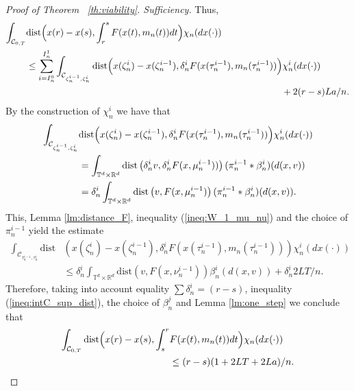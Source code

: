 \documentclass[12pt]{article}
\newcommand{\ac}[2]{\mathcal{C}_{{#1},{#2}}}
\newcommand{\inttrd}{\int_{\mathbb{T}^d\times \mathbb{R}^d}}
\begin{document}
\begin{proof}[Proof of Theorem ~\ref{th:viability}. Sufficiency]
Thus,
\begin{equation}\label{ineq:intC_sup_dist}
\begin{split}
\int_{\mathcal{C}_{0,T}}&\mathrm{dist}\Bigl( x(r)-x(s),\int_r^s F(x(t),m_n(t))dt\Bigr)\chi_n(dx(\cdot))\\ &\leq
\sum_{i=I_n^0}^{I^1_n}\int_{\mathcal{C}_{\zeta_n^{i-1},\zeta_n^{i}}}\mathrm{dist} \Bigl(x(\zeta^i_n)-x(\zeta^{i-1}_n), \delta^i_nF(x(\tau^{i-1}_n),m_n(\tau^{i-1}_n))\Bigr)\chi_n^i(dx(\cdot))\\&{} \hspace{274pt}+2(r-s)La/n.
\end{split}
\end{equation}
By the construction of $\chi_n^i$ we have that
\begin{equation*}
\begin{split}
\int_{\mathcal{C}_{\zeta_n^{i-1},\zeta_n^{i}}}&\mathrm{dist} \Bigl(x(\zeta^i_n)-x(\zeta^{i-1}_n), \delta^i_nF(x(\tau^{i-1}_n),m_n(\tau^{i-1}_n))\Bigr)\chi_n^i(dx(\cdot))\\&=
\inttrd \mathrm{dist}\left(\delta^i_nv, \delta^i_nF(x,\mu_n^{i-1}))\right)(\pi_n^{i-1}*\beta_n^{i})(d(x,v)) \\&=\delta^i_n\inttrd \mathrm{dist}\left(v, F(x,\mu_n^{i-1})\right)(\pi_n^{i-1}*\beta_n^{i})(d(x,v)).
\end{split}
\end{equation*}
This, Lemma \ref{lm:distance_F}, inequality (\ref{ineq:W_1_mu_nu}) and the choice of $\pi_n^{i-1}$ yield the estimate
\begin{equation*}
\begin{split}
\int_{\ac{\tau_n^{i-1}}{\tau_n^{i}}}\mathrm{dist}&\left(x(\zeta^i_n)-x(\zeta^{i-1}_n), \delta^i_nF(x(\tau^{i-1}_n),m_n(\tau^{i-1}_n))\right)\chi_n^i(dx(\cdot))\\
&\leq\delta^i_n\inttrd \mathrm{dist}\left(v, F(x,\nu^{i-1}_n)\right)\beta_n^{i}(d(x,v))+\delta^{i}_n2LT/n.
\end{split}\end{equation*}
Therefore, taking into account equality $\sum \delta^i_n=(r-s)$, inequality (\ref{ineq:intC_sup_dist}), the choice of $\beta_n^j$ and Lemma \ref{lm:one_step} we conclude that
\begin{equation}\label{estima:chi_n_distance_F}
\begin{split}
\int_{\ac{0}{T}}\mathrm{dist}\Bigl( x(r)-x(s),\int_s^r &F(x(t),m_n(t))dt\Bigr)\chi_n(dx(\cdot)) \\ &\leq 
(r-s)(1+2LT+2La)/n.
\end{split}
\end{equation}


\end{proof}
\end{document}
